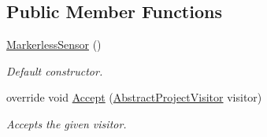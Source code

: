 \subsection*{Public Member Functions}
\begin{DoxyCompactItemize}
\item 
\hyperlink{class_a_rdev_kit_1_1_model_1_1_project_1_1_markerless_sensor_ad1c6ab110245698ad3e0a8adff8857d1}{Markerless\-Sensor} ()
\begin{DoxyCompactList}\small\item\em Default constructor. \end{DoxyCompactList}\item 
override void \hyperlink{class_a_rdev_kit_1_1_model_1_1_project_1_1_markerless_sensor_a28dd4f8d16e0112ae1f1bfd948c90c59}{Accept} (\hyperlink{class_a_rdev_kit_1_1_controller_1_1_project_controller_1_1_abstract_project_visitor}{Abstract\-Project\-Visitor} visitor)
\begin{DoxyCompactList}\small\item\em Accepts the given visitor. \end{DoxyCompactList}\end{DoxyCompactItemize}
